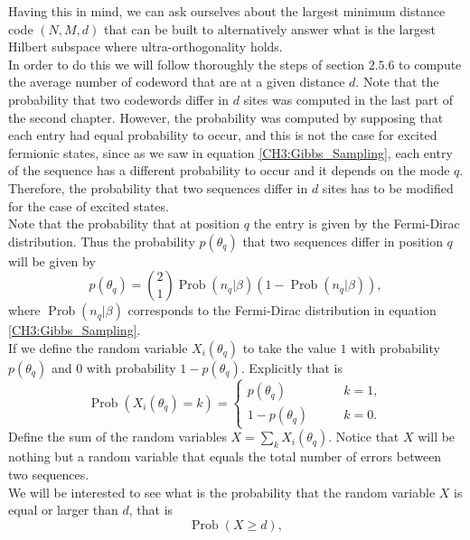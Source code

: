 Having this in mind, we can ask ourselves about the largest minimum distance code $(N,M,d)$ that can be built to alternatively answer what is the largest Hilbert subspace where ultra-orthogonality holds.\\
\indent In order to do this we will follow thoroughly the steps of section $2.5.6$ to compute the average number of codeword that are at a given distance $d$. Note that the probability that two codewords differ in $d$ sites was computed in the last part of the second chapter. However, the probability was computed by supposing that each entry had equal probability to occur, and this is not the case for excited fermionic states, since as we saw in equation \eqref{CH3:Gibbs_Sampling}, each entry of the sequence has a different probability to occur and it depends on the mode $q$. Therefore, the probability that two sequences differ in $d$ sites has to be modified for the case of excited states.\\
\indent Note that the probability that at position $q$ the entry is given by the Fermi-Dirac distribution. Thus the probability $p(\theta_q)$ that two sequences differ in position $q$ will be given by
\begin{equation}
p(\theta_q) = {2\choose 1}\operatorname{Prob}(n_{q}|\beta)\left(1- \operatorname{Prob}(n_{q}|\beta)\right),
\end{equation}
where $\operatorname{Prob}(n_{q}|\beta)$ corresponds to the Fermi-Dirac distribution in equation \eqref{CH3:Gibbs_Sampling}.\\
\indent If we define the random variable $X_i(\theta_q)$ to take the value $1$ with probability $p(\theta_q)$ and $0$ with probability $1-p(\theta_q)$. Explicitly that is
\begin{equation}
\operatorname{Prob}(X_i(\theta_q)= k) = \begin{cases}
p(\theta_q )\qquad &k=1,\\
1-p(\theta_q) \qquad &k=0.
\end{cases}
\end{equation}
Define the sum of the random variables $X=\sum_{k}X_i(\theta_q)$. Notice that $X$ will be nothing but a random variable that equals the total number of errors between two sequences.\\
\indent We will be interested to see what is the probability that the random variable $X$ is equal or larger than $d$, that is
\begin{equation}
\operatorname{Prob}(X\geq d),
\label{CH3:probability_to_bound}
\end{equation}
